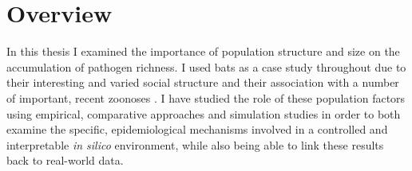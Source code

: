 
\section{Overview}

In this thesis I examined the importance of population structure and size on the accumulation of pathogen richness.
I used bats as a case study throughout due to their interesting and varied social structure \cite{kerth2008causes} and their association with a number of important, recent zoonoses \cite{leroy2005fruit, field2001natural, halpin2011pteropid, li2005bats}.
I have studied the role of these population factors using empirical, comparative approaches and simulation studies in order to both examine the specific, epidemiological mechanisms involved in a controlled and interpretable \emph{in silico} environment, while also being able to link these results back to real-world data.






